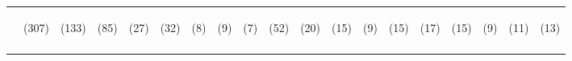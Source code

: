 \begin{tabular}{lcccccccccccccccccc}
 & \begin{footnotesize}(307)\end{footnotesize} & \begin{footnotesize}(133)\end{footnotesize} & \begin{footnotesize}(85)\end{footnotesize} & \begin{footnotesize}(27)\end{footnotesize} & \begin{footnotesize}(32)\end{footnotesize} & \begin{footnotesize}(8)\end{footnotesize} & \begin{footnotesize}(9)\end{footnotesize} & \begin{footnotesize}(7)\end{footnotesize} & \begin{footnotesize}(52)\end{footnotesize} & \begin{footnotesize}(20)\end{footnotesize} & \begin{footnotesize}(15)\end{footnotesize} & \begin{footnotesize}(9)\end{footnotesize} & \begin{footnotesize}(15)\end{footnotesize} & \begin{footnotesize}(17)\end{footnotesize} & \begin{footnotesize}(15)\end{footnotesize} & \begin{footnotesize}(9)\end{footnotesize} & \begin{footnotesize}(11)\end{footnotesize} & \begin{footnotesize}(13)\end{footnotesize}\\
\noalign{\smallskip}\hline\end{tabular}\\
